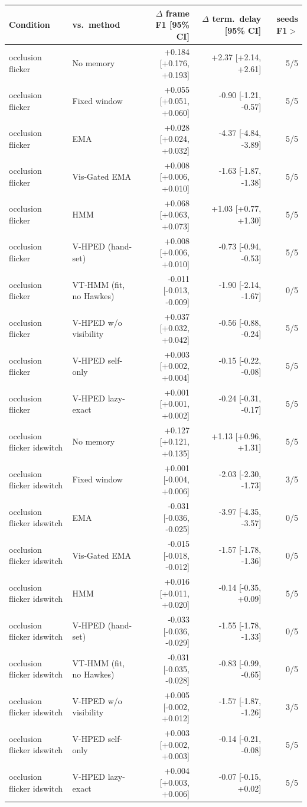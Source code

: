 \begin{tabular}{llrrr}
\toprule
Condition & vs.\ method & $\Delta$ frame F1 [95\% CI] & $\Delta$ term.\ delay [95\% CI] & seeds F1$>$ \\
\midrule
occlusion flicker & No memory & +0.184 [+0.176, +0.193] & +2.37 [+2.14, +2.61] & 5/5 \\
occlusion flicker & Fixed window & +0.055 [+0.051, +0.060] & -0.90 [-1.21, -0.57] & 5/5 \\
occlusion flicker & EMA & +0.028 [+0.024, +0.032] & -4.37 [-4.84, -3.89] & 5/5 \\
occlusion flicker & Vis-Gated EMA & +0.008 [+0.006, +0.010] & -1.63 [-1.87, -1.38] & 5/5 \\
occlusion flicker & HMM & +0.068 [+0.063, +0.073] & +1.03 [+0.77, +1.30] & 5/5 \\
occlusion flicker & V-HPED (hand-set) & +0.008 [+0.006, +0.010] & -0.73 [-0.94, -0.53] & 5/5 \\
occlusion flicker & VT-HMM (fit, no Hawkes) & -0.011 [-0.013, -0.009] & -1.90 [-2.14, -1.67] & 0/5 \\
occlusion flicker & V-HPED w/o visibility & +0.037 [+0.032, +0.042] & -0.56 [-0.88, -0.24] & 5/5 \\
occlusion flicker & V-HPED self-only & +0.003 [+0.002, +0.004] & -0.15 [-0.22, -0.08] & 5/5 \\
occlusion flicker & V-HPED lazy-exact & +0.001 [+0.001, +0.002] & -0.24 [-0.31, -0.17] & 5/5 \\
occlusion flicker idswitch & No memory & +0.127 [+0.121, +0.135] & +1.13 [+0.96, +1.31] & 5/5 \\
occlusion flicker idswitch & Fixed window & +0.001 [-0.004, +0.006] & -2.03 [-2.30, -1.73] & 3/5 \\
occlusion flicker idswitch & EMA & -0.031 [-0.036, -0.025] & -3.97 [-4.35, -3.57] & 0/5 \\
occlusion flicker idswitch & Vis-Gated EMA & -0.015 [-0.018, -0.012] & -1.57 [-1.78, -1.36] & 0/5 \\
occlusion flicker idswitch & HMM & +0.016 [+0.011, +0.020] & -0.14 [-0.35, +0.09] & 5/5 \\
occlusion flicker idswitch & V-HPED (hand-set) & -0.033 [-0.036, -0.029] & -1.55 [-1.78, -1.33] & 0/5 \\
occlusion flicker idswitch & VT-HMM (fit, no Hawkes) & -0.031 [-0.035, -0.028] & -0.83 [-0.99, -0.65] & 0/5 \\
occlusion flicker idswitch & V-HPED w/o visibility & +0.005 [-0.002, +0.012] & -1.57 [-1.87, -1.26] & 3/5 \\
occlusion flicker idswitch & V-HPED self-only & +0.003 [+0.002, +0.003] & -0.14 [-0.21, -0.08] & 5/5 \\
occlusion flicker idswitch & V-HPED lazy-exact & +0.004 [+0.003, +0.006] & -0.07 [-0.15, +0.02] & 5/5 \\
\bottomrule
\end{tabular}
